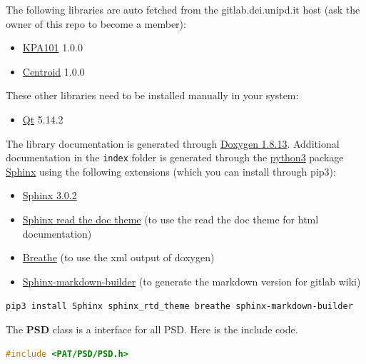 
The following libraries are auto fetched from the gitlab.dei.unipd.it
host (ask the owner of this repo to become a member):

\begin{itemize}
  \tightlist
  \item
        \href{https://gitlab.dei.unipd.it/PAT/KPA101.git}{KPA101} 1.0.0
  \item
        \href{https://gitlab.dei.unipd.it/PAT/Centroid.git}{Centroid} 1.0.0
\end{itemize}

These other libraries need to be installed manually in your system:

\begin{itemize}
  \tightlist
  \item
        \href{https://www.qt.io/}{Qt} 5.14.2
\end{itemize}

The library documentation is generated through
\href{http://www.doxygen.nl/download.html}{Doxygen 1.8.13}. Additional
documentation in the \texttt{index} folder is generated through the
\href{https://www.anaconda.com/products/individual}{python3} package
\href{https://www.sphinx-doc.org/en/master/}{Sphinx} using the following
extensions (which you can install through pip3):

\begin{itemize}
  \tightlist
  \item
        \href{https://pypi.org/project/Sphinx/}{Sphinx 3.0.2}
  \item
        \href{https://sphinx-rtd-theme.readthedocs.io/en/stable/}{Sphinx read
          the doc theme} (to use the read the doc theme for html documentation)
  \item
        \href{https://pypi.org/project/breathe/}{Breathe} (to use the xml
        output of doxygen)
  \item
        \href{https://pypi.org/project/sphinx-markdown-builder/}{Sphinx-markdown-builder}
        (to generate the markdown version for gitlab wiki)
\end{itemize}

\texttt{pip3\ install\ Sphinx\ sphinx\_rtd\_theme\ breathe\ sphinx-markdown-builder}



The \textbf{PSD} class is a interface for all PSD. Here is the include
code.

\begin{lstlisting}[language=c++, gobble=2]
  #include <PAT/PSD/PSD.h>
\end{lstlisting}

